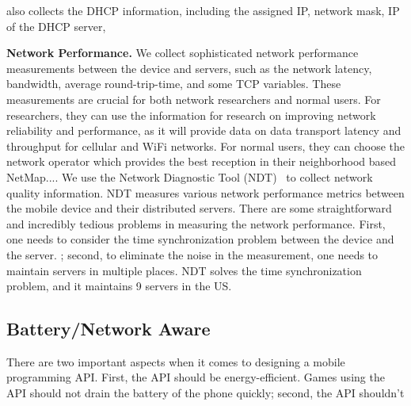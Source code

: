 \name{} also collects the DHCP information, including the assigned IP, network mask, IP of the DHCP server, 
 
{\bfseries Network Performance.} We collect sophisticated network performance measurements between the device
and servers, such as the network latency, bandwidth, average round-trip-time, and some TCP variables. These
measurements are crucial for both network researchers and normal users. For researchers, they can use the 
information for research on improving network reliability and performance, as it will provide data on data 
transport latency and throughput for cellular and WiFi networks. For normal users, they can choose the 
network operator which provides the best reception in their neighborhood based NetMap.... 
We use the Network Diagnostic Tool (NDT)~\cite{NDT} to collect network quality information. NDT measures various network 
performance metrics between the mobile device and their distributed servers. There are some straightforward 
and incredibly tedious problems in measuring the network performance. First, one needs to consider the time 
synchronization problem between the device and the server. 
; second, to eliminate the noise in the measurement, 
one needs to maintain servers in multiple places. NDT solves the time synchronization problem, and it maintains 9 servers in the US.

\subsection{Battery/Network Aware}
There are two important aspects when it comes to designing a mobile programming API. First, the API should be energy-efficient. 
Games using the API should not drain the battery of the phone quickly; second, the API shouldn't 
 

